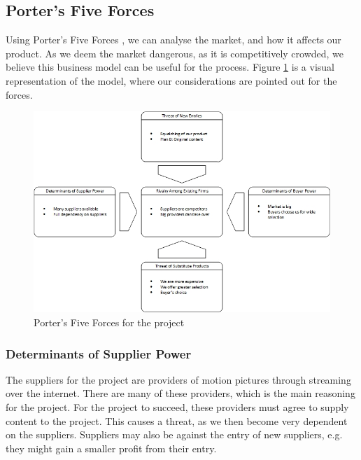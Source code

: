 \subsection{Porter's Five Forces}

Using Porter's Five Forces \cite[p. 16-17]{fiveForces}, we can analyse the market, and how it affects our product. As we deem the market dangerous, as it is competitively crowded, we believe this business model can be useful for the process. Figure \ref{fig:five_forces} is a visual representation of the model, where our considerations are pointed out for the forces.

\begin{figure}[h]
    \begin{center}
        \includegraphics[scale=0.75]{./pics/five_forces}
        \caption{Porter's Five Forces for the project}
        \label{fig:five_forces}
    \end{center}
\end{figure}

\subsubsection*{Determinants of Supplier Power}
The suppliers for the project are providers of motion pictures through streaming over the internet. There are many of these providers, which is the main reasoning for the project. For the project to succeed, these providers must agree to supply content to the project. This causes a threat, as we then become very dependent on the suppliers. Suppliers may also be against the entry of new suppliers, e.g. they might gain a smaller profit from their entry.

